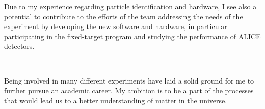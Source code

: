 \documentclass[a4paper]{article}
\begin{document}

Due to my experience regarding particle identification and hardware, I see also a potential to contribute to the efforts of the team addressing the needs of the experiment by developing the new software and hardware, in particular participating in the fixed-target program and studying the performance of ALICE detectors.

~\par Being involved in many different experiments have laid a solid ground for me to further pursue an academic career. My ambition is to be a part of the processes that would lead us to a better understanding of matter in the universe.
\end{document}
